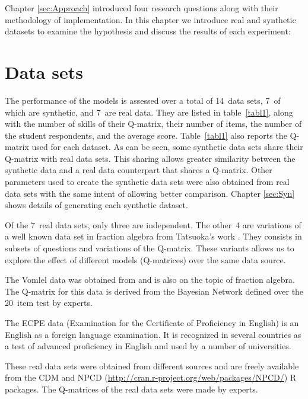 \label{sec:SIGNATURE}

Chapter \ref{sec:Approach} introduced four research questions along with their methodology of implementation. In this chapter we introduce real and synthetic datasets to examine the hypothesis and discuss the results of each experiment:

\section{Data sets}

The performance of the models is assessed over a total of 14~data sets, 7~of which are synthetic, and 7~are real data.  They are listed in table~\ref{tabl1}, along with the number of skills of their Q-matrix, their number of items, the number of the student respondents, and the average score.  Table~\ref{tabl1} also reports the Q-matrix used for each dataset.  As can be seen, some synthetic data sets share their Q-matrix with real data sets.  This sharing allows greater similarity between the synthetic data and a real data counterpart that shares a Q-matrix.  Other parameters used to create the synthetic data sets were also obtained from real data sets with the same intent of allowing better comparison. Chapter \ref{sec:Syn} shows details of generating each synthetic dataset.

Of the 7~real data sets, only three are independent.  The other~4 are variations of a well known data set in fraction algebra from Tatsuoka's work \citep{tatsuoka1984analysis}.  They consists in subsets of questions and variations of the Q-matrix.  These variants allows us to explore the effect of different models (Q-matrices) over the same data source.

The Vomlel data was obtained from \citep{vomlel:2004} and is also on the topic of fraction algebra.  The Q-matrix for this data is derived from the Bayesian Network defined over the 20~item test by experts.

The ECPE data (Examination for the Certificate of Proficiency in English) is an English as a foreign language examination. It is recognized in several countries as a test of advanced proficiency in English and used by a number of universities.

These real data sets were obtained from different sources and are freely available from the CDM \citep{Robitzsch2012} and NPCD ({\url{http://cran.r-project.org/web/packages/NPCD/}}) R packages. The Q-matrices of the real data sets were made by experts.


